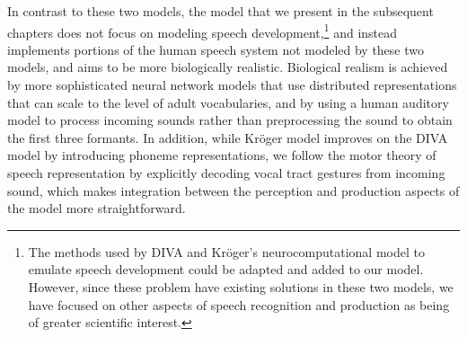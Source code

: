 In contrast to these two models,
the model that we present
in the subsequent chapters does not focus on
modeling speech development,\footnote{
  The methods used by DIVA and Kr\"{o}ger's
  neurocomputational model to emulate
  speech development could be adapted
  and added to our model.
  However, since these problem have existing
  solutions in these two models,
  we have focused on other aspects
  of speech recognition and production
  as being of greater scientific interest.}
and instead implements
portions of the human speech system
not modeled by these two models,
and aims to be more biologically realistic.
Biological realism is achieved
by more sophisticated neural network models
that use distributed representations
that can scale to the level
of adult vocabularies,
and by using a human auditory model
to process incoming sounds
rather than preprocessing the sound
to obtain the first three formants.
In addition, while Kr\"{o}ger model
improves on the DIVA model by
introducing phoneme representations,
we follow the motor theory
of speech representation by
explicitly decoding vocal tract gestures
from incoming sound,
which makes integration between
the perception and production aspects
of the model more straightforward.


